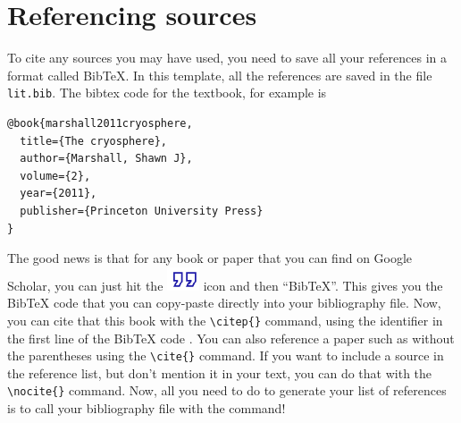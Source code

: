 \documentclass[letterus,times]{SIOpset}
\begin{document}
\section{Referencing sources}

To cite any sources you may have used, you need to save all your references in a format called BibTeX. In this template, all the references are saved in the file \texttt{lit.bib}. The bibtex code for the textbook, for example is 
\begin{verbatim}
@book{marshall2011cryosphere,
  title={The cryosphere},
  author={Marshall, Shawn J},
  volume={2},
  year={2011},
  publisher={Princeton University Press}
}
\end{verbatim}
The good news is that for any book or paper that you can find on Google Scholar, you can just hit the \includegraphics[scale=0.8]{figs/cite.png} icon and then ``BibTeX''. This gives you the BibTeX code that you can copy-paste directly into your bibliography file. 
Now, you can cite that this book with the \verb|\citep{}| command, using the identifier in the first line of the BibTeX code \citep{marshall2011cryosphere}. 
You can also reference a paper such as \cite{fricker2007active} without the parentheses using the \verb|\cite{}| command. 
If you want to include a source in the reference list, but don't mention it in your text, you can do that with the \verb|\nocite{}| command. 
\nocite{holton2004} %
Now, all you need to do to generate your list of references is to call your bibliography file with the \verb|| command! %





\ifelectronic 
\end{document}
